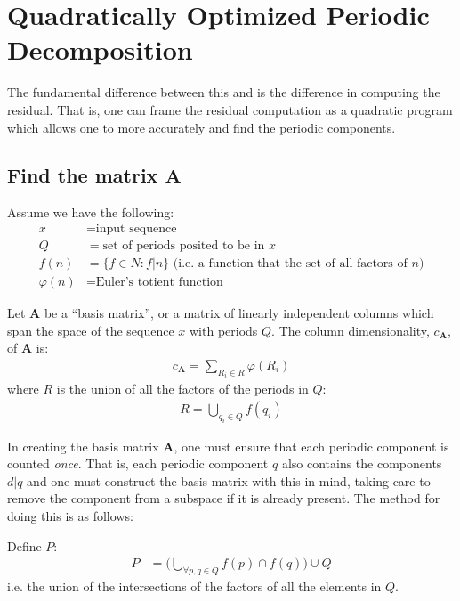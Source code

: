 \chapter{Quadratically Optimized Periodic Decomposition} \label{chap:qo}

The fundamental difference between this and \cite{sethares1999periodicity} is the difference in computing the residual. That is, one can frame the residual computation as a quadratic program which allows one to more accurately and find the periodic components.

\section{Find the matrix $\bm{A}$}
Assume we have the following:
\begin{align*}
x &= \text{input sequence} \\
Q &= \text{set of periods posited to be in } x \\
f(n) &= \{f \in N : f|n \} \text{ (i.e. a function that the set of all factors of $n$)} \\
\varphi(n) &= \text{Euler's totient function}
\end{align*}

Let $\bm{A}$ be a ``basis matrix'', or a matrix of linearly independent columns which span the space of the sequence $x$ with periods $Q$. The column dimensionality, $c_{\bm{A}}$, of $\bm{A}$ is:
\begin{align*}
    c_{\bm{A}} = \sum_{R_i \in R} \varphi(R_i)
\end{align*}
where $R$ is the union of all the factors of the periods in $Q$:
\begin{align*}
    R = \bigcup_{q_i \in Q} f(q_i)
\end{align*}

In creating the basis matrix $\bm{A}$, one must ensure that each periodic component is counted \emph{once}. That is, each periodic component $q$ also contains the components $d|q$ and one must construct the basis matrix with this in mind, taking care to remove the component from a subspace if it is already present. The method for doing this is as follows:




Define $P$:
\begin{align*}
    P &= \Bigg( \bigcup_{\forall p, q \in Q} f(p) \cap f(q) \Bigg) \cup Q
\end{align*}
i.e. the union of the intersections of the factors of all the elements in $Q$.

